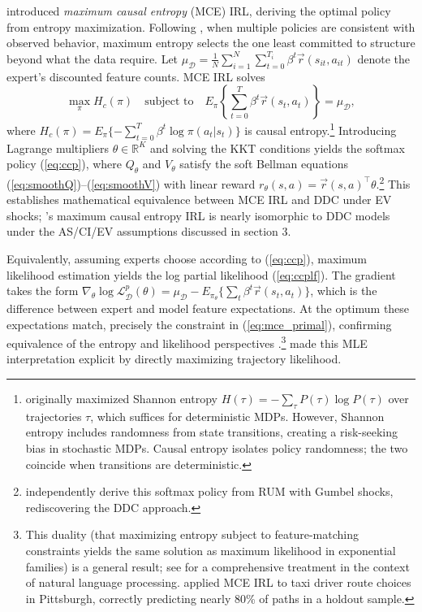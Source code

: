 \citet{ziebart:2010} introduced {\it maximum causal entropy\/} (MCE) IRL, deriving the optimal policy from entropy maximization. Following \citet{jaynes:1957}, when multiple policies are consistent with observed behavior, maximum entropy selects the one least committed to structure beyond what the data require. Let $\mu_{\mathcal{D}} = \frac{1}{N}\sum_{i=1}^{N}\sum_{t=0}^{T_i} \beta^t \vec{r}(s_{it},a_{it})$ denote the expert's discounted feature counts. MCE IRL solves
\begin{equation}
    \max_{\pi} H_c(\pi) \quad \text{subject to} \quad E_\pi\left\{\sum_{t=0}^{T} \beta^t \vec{r}(s_t,a_t)\right\} = \mu_{\mathcal{D}},
\label{eq:mce_primal}
\end{equation}
where $H_c(\pi) = E_\pi\{-\sum_{t=0}^{T} \beta^t \log \pi(a_t|s_t)\}$ is causal entropy.\footnote{\footnotesize \citet{ziebart:2008} originally maximized Shannon entropy $H(\tau) = -\sum_\tau P(\tau)\log P(\tau)$ over trajectories $\tau$, which suffices for deterministic MDPs. However, Shannon entropy includes randomness from state transitions, creating a risk-seeking bias in stochastic MDPs. Causal entropy isolates policy randomness; the two coincide when transitions are deterministic.} Introducing Lagrange multipliers $\theta \in \mathbb{R}^K$ and solving the KKT conditions yields the softmax policy (\ref{eq:ccp}), where $Q_\theta$ and $V_\theta$ satisfy the soft Bellman equations (\ref{eq:smoothQ})--(\ref{eq:smoothV}) with linear reward $r_\theta(s,a) = \vec{r}(s,a)^{\top}\theta$.\footnote{\footnotesize \citet{pitombeira:2024} independently derive this softmax policy from RUM with Gumbel shocks, rediscovering the DDC approach.} This establishes mathematical equivalence between MCE IRL and DDC under EV shocks; \citet{ziebart:2010}'s maximum causal entropy IRL is nearly isomorphic to DDC models under the AS/CI/EV assumptions discussed in section 3.

Equivalently, assuming experts choose according to (\ref{eq:ccp}), maximum likelihood estimation yields the log partial likelihood (\ref{eq:ccplf}). The gradient takes the form $\nabla_\theta \log \mathcal{L}^p_{\mathcal{D}}(\theta) = \mu_{\mathcal{D}} - E_{\pi_\theta}\{\sum_{t} \beta^t \vec{r}(s_t,a_t)\}$, which is the difference between expert and model feature expectations. At the optimum these expectations match, precisely the constraint in (\ref{eq:mce_primal}), confirming equivalence of the entropy and likelihood perspectives \citep{ziebart:2010}.\footnote{\footnotesize This duality (that maximizing entropy subject to feature-matching constraints yields the same solution as maximum likelihood in exponential families) is a general result; see \citet{berger:1996} for a comprehensive treatment in the context of natural language processing. \citet{ziebart:2008} applied MCE IRL to taxi driver route choices in Pittsburgh, correctly predicting nearly 80\% of paths in a holdout sample.} \citet{mlirl:2011} made this MLE interpretation explicit by directly maximizing trajectory likelihood.

